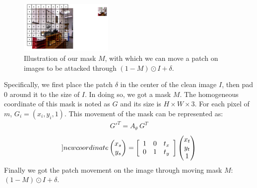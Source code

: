 \documentclass[10pt,twocolumn,letterpaper]{article}
\begin{document}
\begin{figure}
	\centering
	\includegraphics[width=0.4\textwidth]{imgs/mask.pdf}
	\caption{Illustration of our mask $M$, with which
	we can move a patch on images to be attacked through
	$(1 - M) \odot I + \delta$.}
	\label{move}
\end{figure}
Specifically, we first place the patch $\delta$
in the center of the 
clean image $I$,
then pad 0 around it to the size of $I$.
In doing so, we got a mask $M$.
The homogeneous coordinate of this 
mask is noted as $G$ and its size is $H\times W\times 3$.
For each pixel of $m$, $G_i = (x_i, y_i, 1)$.
This movement of the mask can be represented as:
\begin{align}
	{G'}^T = A_{\theta}~{G}^T
\end{align}
\begin{align}
	\label[]{new coordinate}
\begin{pmatrix}
	x_s\\
	y_s	
	\end{pmatrix} = 
		\left[
			\begin{array}{ccc}
				1 & 0 & t_x \\
				0 & 1 & t_y \\
			\end{array}
			\right] 
			\begin{pmatrix}
				x_t\\
				y_t\\
				1	
				\end{pmatrix} 
\end{align}
Finally we got the patch movement on the image 
through moving mask $M$: $(1 - M) \odot I + \delta$.

\end{document}
